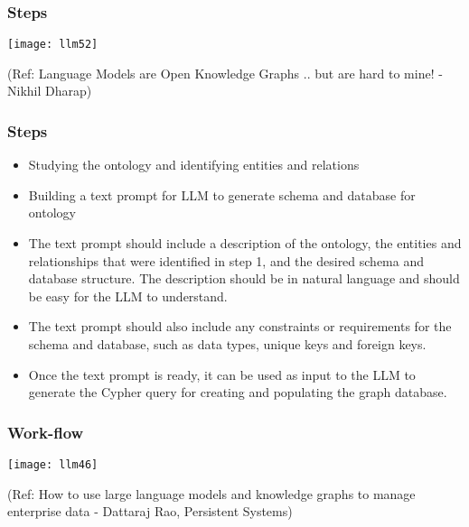 \begin{frame}[fragile]\frametitle{Steps}

\begin{center}
\texttt{[image: llm52]}
\end{center}	

{\tiny (Ref: Language Models are Open Knowledge Graphs .. but are hard to mine! - Nikhil Dharap)}
\end{frame}



\begin{frame}[fragile]\frametitle{Steps}

\begin{itemize}
\item Studying the ontology and identifying entities and relations
\item Building a text prompt for LLM to generate schema and database for ontology
\item The text prompt should include a description of the ontology, the entities and relationships that were identified in step 1, and the desired schema and database structure. The description should be in natural language and should be easy for the LLM to understand. 
\item The text prompt should also include any constraints or requirements for the schema and database, such as data types, unique keys and foreign keys.
\item Once the text prompt is ready, it can be used as input to the LLM to generate the Cypher query for creating and populating the graph database.
\end{itemize}
\end{frame}



\begin{frame}[fragile]\frametitle{Work-flow}

\begin{center}
\texttt{[image: llm46]}

{\tiny (Ref: How to use large language models and knowledge graphs to manage enterprise data - Dattaraj Rao, Persistent Systems)}
\end{center}
\end{frame}


